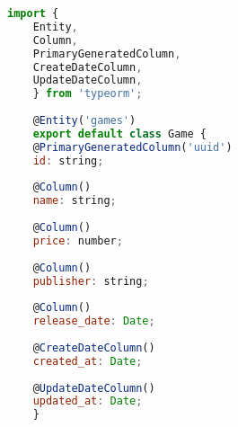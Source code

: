 \begin{lstlisting}[language=JavaScript, caption={Game.ts},captionpos=b, label=alg:game]
import {
    Entity,
    Column,
    PrimaryGeneratedColumn,
    CreateDateColumn,
    UpdateDateColumn,
    } from 'typeorm';
    
    @Entity('games')
    export default class Game {
    @PrimaryGeneratedColumn('uuid')
    id: string;
    
    @Column()
    name: string;
    
    @Column()
    price: number;
    
    @Column()
    publisher: string;
    
    @Column()
    release_date: Date;
    
    @CreateDateColumn()
    created_at: Date;
    
    @UpdateDateColumn()
    updated_at: Date;
    }
\end{lstlisting}
